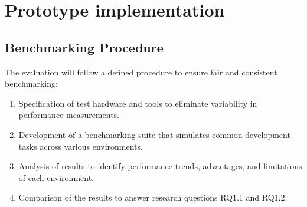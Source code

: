 \section{Prototype implementation}\label{methodology_prototype}

\subsection{Benchmarking Procedure}
The evaluation will follow a defined procedure to ensure fair and consistent benchmarking:
\begin{enumerate}
    \item Specification of test hardware and tools to eliminate variability in performance measurements.
    \item Development of a benchmarking suite that simulates common development tasks across various environments.
    \item Analysis of results to identify performance trends, advantages, and limitations of each environment.
    \item Comparison of the results to answer research questions RQ1.1 and RQ1.2.
\end{enumerate}

